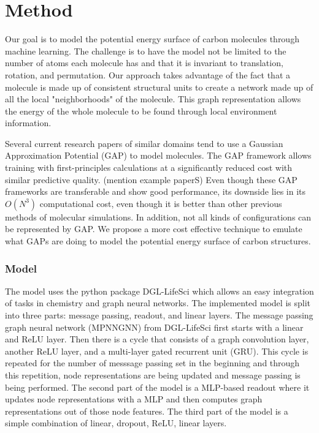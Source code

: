 \documentclass[12pt, abstract = true]{scrartcl}
\begin{document}
\newpage 

\section{Method}
Our goal is to model the potential energy surface of carbon molecules through machine learning. The challenge is to have the model not be limited to the number of atoms each molecule has and that it is invariant to translation, rotation, and permutation. Our approach takes advantage of the fact that a molecule is made up of consistent structural units to create a network made up of all the local "neighborhoods" of the molecule. This graph representation allows the energy of the whole molecule to be found through local environment information.

Several current research papers\cite{ex1,ex2,gap20} of similar domains tend to use a Gaussian Approximation Potential (GAP) to model molecules. The GAP framework allows training with first-principles calculations at a significantly reduced cost with similar predictive quality. (mention example paperS) Even though these GAP frameworks are transferable and show good performance, its downside lies in its $O(N^3)$ computational cost, even though it is better than other previous methods of molecular simulations. In addition, not all kinds of configurations can be represented by GAP. We propose a more cost effective technique to emulate what GAPs are doing to model the potential energy surface of carbon structures.

\subsubsection{Model} 
The model uses the python package DGL-LifeSci\cite{dgllife} which allows an easy integration of tasks in 
chemistry and graph neural networks. The implemented model is split into three parts: message passing, 
readout, and linear layers. The message passing graph neural network (MPNNGNN) from DGL-LifeSci first starts 
with a linear and ReLU layer. Then there is a cycle that consists of a graph convolution layer, another 
ReLU layer, and a multi-layer gated recurrent unit (GRU). This cycle is repeated for the number of 
messsage passing set in the beginning and through this repetition, node representations are being updated 
and message passing is being performed. The second part of the model is a MLP-based readout where it 
updates node representations with a MLP and then computes graph representations out of those node features. 
The third part of the model is a simple combination of linear, dropout, ReLU, linear layers.
\end{document}
